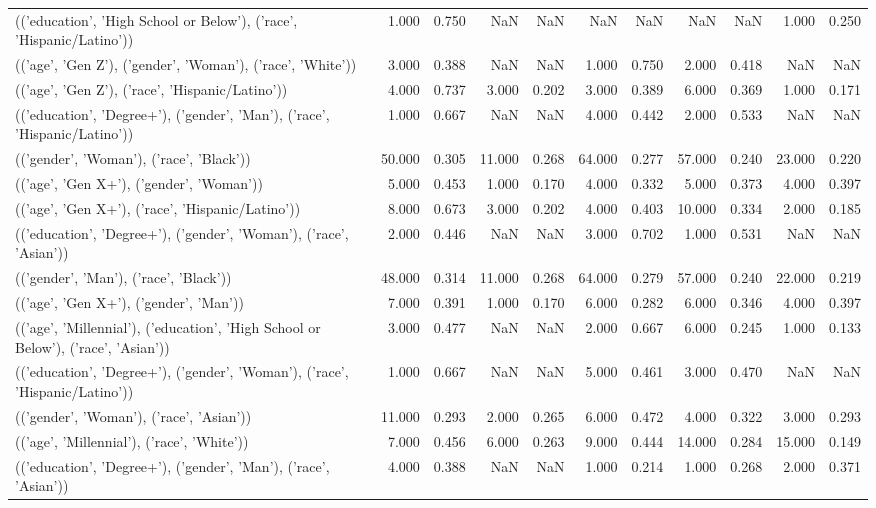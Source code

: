 \begin{tabular}{lrrrrrrrrrr}
(('education', 'High School or Below'), ('race', 'Hispanic/Latino')) & 1.000 & 0.750 & NaN & NaN & NaN & NaN & NaN & NaN & 1.000 & 0.250 \\
(('age', 'Gen Z'), ('gender', 'Woman'), ('race', 'White')) & 3.000 & 0.388 & NaN & NaN & 1.000 & 0.750 & 2.000 & 0.418 & NaN & NaN \\
(('age', 'Gen Z'), ('race', 'Hispanic/Latino')) & 4.000 & 0.737 & 3.000 & 0.202 & 3.000 & 0.389 & 6.000 & 0.369 & 1.000 & 0.171 \\
(('education', 'Degree+'), ('gender', 'Man'), ('race', 'Hispanic/Latino')) & 1.000 & 0.667 & NaN & NaN & 4.000 & 0.442 & 2.000 & 0.533 & NaN & NaN \\
(('gender', 'Woman'), ('race', 'Black')) & 50.000 & 0.305 & 11.000 & 0.268 & 64.000 & 0.277 & 57.000 & 0.240 & 23.000 & 0.220 \\
(('age', 'Gen X+'), ('gender', 'Woman')) & 5.000 & 0.453 & 1.000 & 0.170 & 4.000 & 0.332 & 5.000 & 0.373 & 4.000 & 0.397 \\
(('age', 'Gen X+'), ('race', 'Hispanic/Latino')) & 8.000 & 0.673 & 3.000 & 0.202 & 4.000 & 0.403 & 10.000 & 0.334 & 2.000 & 0.185 \\
(('education', 'Degree+'), ('gender', 'Woman'), ('race', 'Asian')) & 2.000 & 0.446 & NaN & NaN & 3.000 & 0.702 & 1.000 & 0.531 & NaN & NaN \\
(('gender', 'Man'), ('race', 'Black')) & 48.000 & 0.314 & 11.000 & 0.268 & 64.000 & 0.279 & 57.000 & 0.240 & 22.000 & 0.219 \\
(('age', 'Gen X+'), ('gender', 'Man')) & 7.000 & 0.391 & 1.000 & 0.170 & 6.000 & 0.282 & 6.000 & 0.346 & 4.000 & 0.397 \\
(('age', 'Millennial'), ('education', 'High School or Below'), ('race', 'Asian')) & 3.000 & 0.477 & NaN & NaN & 2.000 & 0.667 & 6.000 & 0.245 & 1.000 & 0.133 \\
(('education', 'Degree+'), ('gender', 'Woman'), ('race', 'Hispanic/Latino')) & 1.000 & 0.667 & NaN & NaN & 5.000 & 0.461 & 3.000 & 0.470 & NaN & NaN \\
(('gender', 'Woman'), ('race', 'Asian')) & 11.000 & 0.293 & 2.000 & 0.265 & 6.000 & 0.472 & 4.000 & 0.322 & 3.000 & 0.293 \\
(('age', 'Millennial'), ('race', 'White')) & 7.000 & 0.456 & 6.000 & 0.263 & 9.000 & 0.444 & 14.000 & 0.284 & 15.000 & 0.149 \\
(('education', 'Degree+'), ('gender', 'Man'), ('race', 'Asian')) & 4.000 & 0.388 & NaN & NaN & 1.000 & 0.214 & 1.000 & 0.268 & 2.000 & 0.371 \\

\end{tabular}
